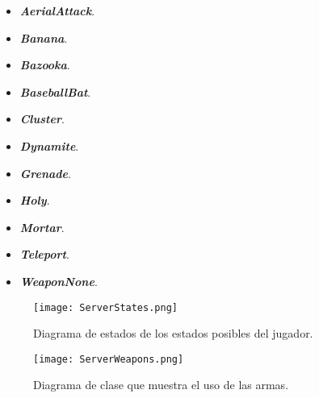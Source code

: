 \begin{itemize}
	\begin{itemize}
		\item \textbf{\textit{AerialAttack}}.
		\item \textbf{\textit{Banana}}.
		\item \textbf{\textit{Bazooka}}.
		\item \textbf{\textit{BaseballBat}}.
		\item \textbf{\textit{Cluster}}.
		\item \textbf{\textit{Dynamite}}.
		\item \textbf{\textit{Grenade}}.
		\item \textbf{\textit{Holy}}.
		\item \textbf{\textit{Mortar}}.
		\item \textbf{\textit{Teleport}}.
		\item \textbf{\textit{WeaponNone}}.
	\end{itemize}
	
\end{itemize}

\begin{sidewaysfigure}[!ht]
	\centering
	\texttt{[image: ServerStates.png]}
	\caption{Diagrama de estados de los estados posibles del jugador.}
	\label{im:serverState}
\end{sidewaysfigure}

\begin{sidewaysfigure}[!ht]
	\centering
	\texttt{[image: ServerWeapons.png]}
	\caption{Diagrama de clase que muestra el uso de las armas.}
	\label{im:serverWeapons}
\end{sidewaysfigure}